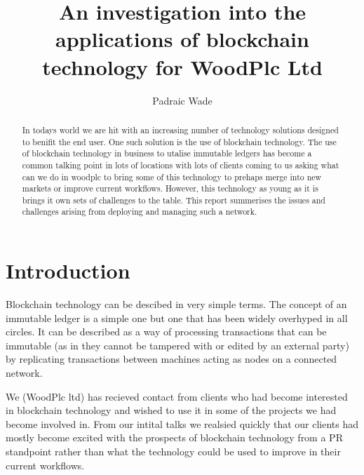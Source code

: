 \documentclass[runningheads]{llncs}
\begin{document}
%
\title{An investigation into the applications of blockchain technology for WoodPlc Ltd}
%
%
\author{Padraic Wade }
%
%
%
\maketitle              %
%
\begin{abstract}
In todays world we are hit with an increasing number of technology solutions designed to benifit the end user. One such solution is the use of blockchain technology.
The use of blockchain technology in business to utalise immutable ledgers has become a common talking point in lots of locations with lots of clients coming to us asking what can we do in woodplc to bring some of this technology to prehaps merge into new markets or improve current workflows.
However, this technology as young as it is brings it own sets of challenges to the table. This report summerises the issues and challenges arising from deploying and managing such a network.

\end{abstract}

\section{Introduction}

Blockchain technology can be descibed in very simple terms. The concept of an immutable ledger is a simple one but one that has been widely overhyped in all circles. It can be described as a way of processing transactions that can be immutable (as in they cannot be tampered with or edited by an external party) by replicating transactions between machines acting as nodes on a connected network.

We (WoodPlc ltd) has recieved contact from clients who had become interested in blockchain technology and wished to use it in some of the projects we had become involved in. From our intital talks we realsied quickly that our clients had mostly become excited with the prospects of blockchain technology from a PR standpoint rather than what the technology could be used to improve in their current workflows.
\end{document}
